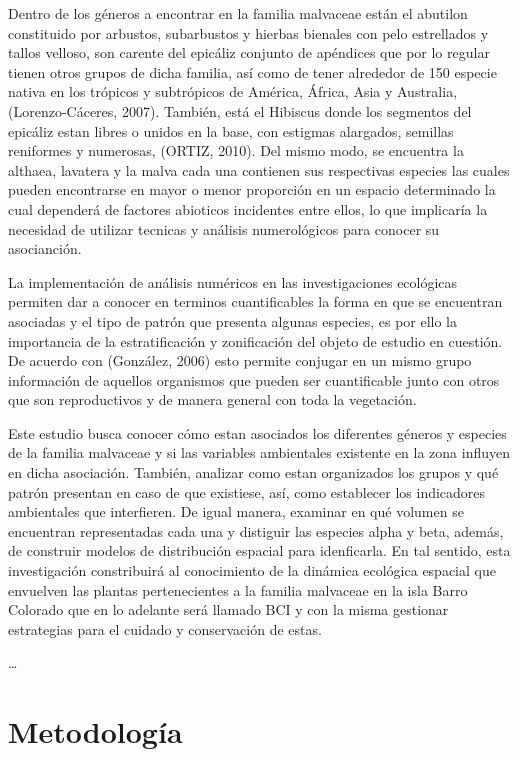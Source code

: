 \documentclass[11pt,]{article}
\begin{document}
Dentro de los géneros a encontrar en la familia malvaceae están el
abutilon constituido por arbustos, subarbustos y hierbas bienales con
pelo estrellados y tallos velloso, son carente del epicáliz conjunto de
apéndices que por lo regular tienen otros grupos de dicha familia, así
como de tener alrededor de 150 especie nativa en los trópicos y
subtrópicos de América, África, Asia y Australia, (Lorenzo-Cáceres,
2007). También, está el Hibiscus donde los segmentos del epicáliz estan
libres o unidos en la base, con estigmas alargados, semillas reniformes
y numerosas, (ORTIZ, 2010). Del mismo modo, se encuentra la althaea,
lavatera y la malva cada una contienen sus respectivas especies las
cuales pueden encontrarse en mayor o menor proporción en un espacio
determinado la cual dependerá de factores abioticos incidentes entre
ellos, lo que implicaría la necesidad de utilizar tecnicas y análisis
numerológicos para conocer su asocianción.

La implementación de análisis numéricos en las investigaciones
ecológicas permiten dar a conocer en terminos cuantificables la forma en
que se encuentran asociadas y el tipo de patrón que presenta algunas
especies, es por ello la importancia de la estratificación y
zonificación del objeto de estudio en cuestión. De acuerdo con
(González, 2006) esto permite conjugar en un mismo grupo información de
aquellos organismos que pueden ser cuantificable junto con otros que son
reproductivos y de manera general con toda la vegetación.

Este estudio busca conocer cómo estan asociados los diferentes géneros y
especies de la familia malvaceae y si las variables ambientales
existente en la zona influyen en dicha asociación. También, analizar
como estan organizados los grupos y qué patrón presentan en caso de que
existiese, así, como establecer los indicadores ambientales que
interfieren. De igual manera, examinar en qué volumen se encuentran
representadas cada una y distiguir las especies alpha y beta, además, de
construir modelos de distribución espacial para idenficarla. En tal
sentido, esta investigación constribuirá al conocimiento de la dinámica
ecológica espacial que envuelven las plantas pertenecientes a la familia
malvaceae en la isla Barro Colorado que en lo adelante será llamado BCI
y con la misma gestionar estrategias para el cuidado y conservación de
estas.

\ldots

\section{Metodología}\label{metodologuxeda}
\end{document}

